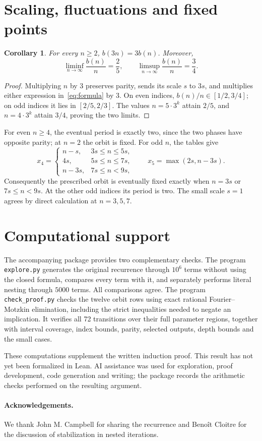 \documentclass[10pt,a4paper]{article}
\newtheorem{corollary}{Corollary}
\begin{document}
\section{Scaling, fluctuations and fixed points}
\begin{corollary}
For every $n\ge2$, $b(3n)=3b(n)$. Moreover,
\[
\liminf_{n\to\infty}\frac{b(n)}n=\frac25,\qquad
\limsup_{n\to\infty}\frac{b(n)}n=\frac34.
\]
\end{corollary}
\begin{proof}
Multiplying $n$ by $3$ preserves parity, sends its scale $s$ to $3s$,
and multiplies either expression in~\eqref{eq:formula} by $3$.
On even indices, $b(n)/n\in[1/2,3/4]$; on odd indices it lies in
$[2/5,2/3]$. The values $n=5\cdot3^k$ attain $2/5$, and
$n=4\cdot3^k$ attain $3/4$, proving the two limits.
\end{proof}

For even $n\ge4$, the eventual period is exactly two, since the two
phases have opposite parity; at $n=2$ the orbit is fixed. For odd $n$,
the tables give
\[
x_4=\begin{cases}
n-s,&3s\le n\le5s,\\
4s,&5s\le n\le7s,\\
n-3s,&7s\le n<9s,
\end{cases}
\qquad x_5=\max(2s,n-3s).
\]
Consequently the prescribed orbit is eventually fixed exactly when
$n=3s$ or $7s\le n<9s$. At the other odd indices its period is two.
The small scale $s=1$ agrees by direct calculation at $n=3,5,7$.

\section{Computational support}
The accompanying package provides two complementary checks. The program
\texttt{explore.py} generates the original recurrence through $10^6$ terms
without using the closed formula, compares every term with it, and separately
performs literal nesting through $5000$ terms. All comparisons agree.
The program \texttt{check\_proof.py} checks the twelve orbit rows using exact
rational Fourier--Motzkin elimination, including the strict inequalities
needed to negate an implication. It verifies all 72 transitions over their
full parameter regions, together with interval coverage, index bounds,
parity, selected outputs, depth bounds and the small cases.

These computations supplement the written induction proof. This result has
not yet been formalized in Lean. AI assistance was used for exploration,
proof development, code generation and writing; the package records the
arithmetic checks performed on the resulting argument.

\paragraph{Acknowledgements.}
We thank John M. Campbell for sharing the recurrence and Beno\^it Cloitre
for the discussion of stabilization in nested iterations.
\end{document}
